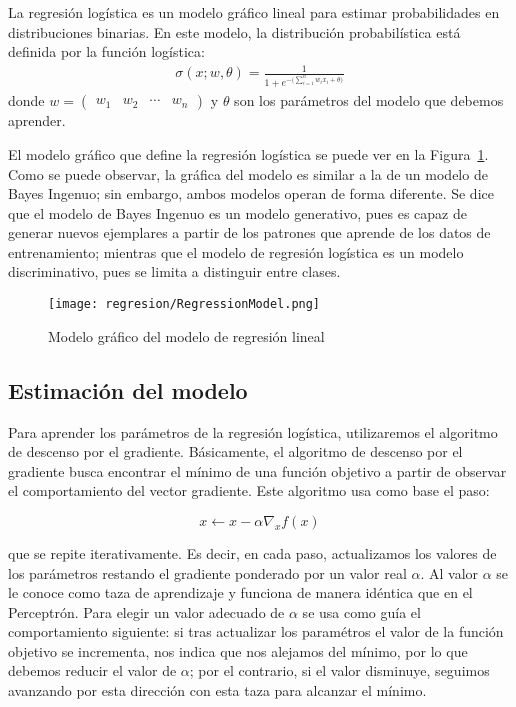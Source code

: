 \begin{definition}
La regresión logística es un modelo gráfico lineal para estimar probabilidades en distribuciones binarias. En este modelo, la distribución probabilística está definida por la función logística:
\begin{align*}
 \sigma(x; w, \theta) = \frac{1}{1 + e^{-\big(\sum_{i=1}^n w_i x_i + \theta\big)}}
\end{align*}
donde $w = \begin{pmatrix} w_1 & w_2 & \cdots & w_n \end{pmatrix}$ y $\theta$ son los parámetros del modelo que debemos aprender.
\end{definition}

El modelo gráfico que define la regresión logística se puede ver en la Figura~\ref{Fig:LinearReg}. Como se puede observar, la gráfica del modelo es similar a la de un modelo de Bayes Ingenuo; sin embargo, ambos modelos operan de forma diferente. Se dice que el modelo de Bayes Ingenuo es un modelo generativo, pues es capaz de generar nuevos ejemplares a partir de los patrones que aprende de los datos de entrenamiento; mientras que el modelo de regresión logística es un modelo discriminativo, pues se limita a distinguir entre clases.

\begin{figure}
 \centering
 \texttt{[image: regresion/RegressionModel.png]}
 \caption{Modelo gráfico del modelo de regresión lineal}\label{Fig:LinearReg}
\end{figure}    




\subsection{Estimación del modelo}

Para aprender los parámetros de la regresión logística, utilizaremos el algoritmo de descenso por el gradiente. Básicamente, el algoritmo de descenso por el gradiente busca encontrar el mínimo de una función objetivo a partir de observar el comportamiento del vector gradiente. Este algoritmo usa como base el paso:

$$ x \leftarrow x - \alpha \nabla_x f(x) $$

que se repite iterativamente.  Es decir, en cada paso, actualizamos los valores de los parámetros restando el gradiente ponderado por un valor real $\alpha$. Al valor $\alpha$ se le conoce como taza de aprendizaje y funciona de manera idéntica que en el Perceptrón.  Para elegir un valor adecuado de $\alpha$ se usa como guía el comportamiento siguiente: si tras actualizar los paramétros el valor de la función objetivo se incrementa, nos indica que nos alejamos del mínimo, por lo que debemos reducir el valor de $\alpha$; por el contrario, si el valor disminuye, seguimos avanzando por esta dirección con esta taza para alcanzar el mínimo.

